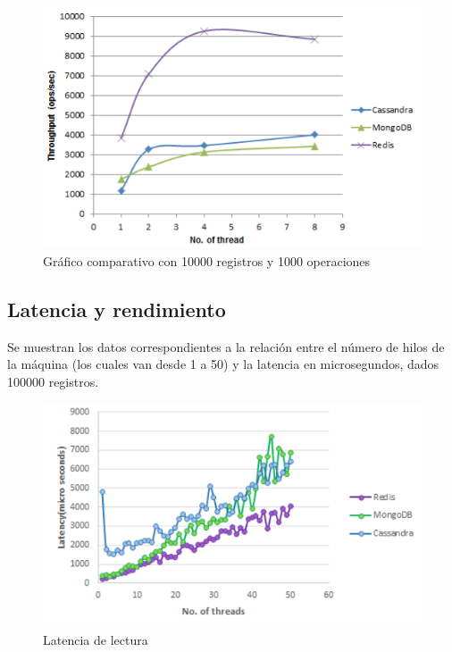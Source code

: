 \documentclass[twocolumn]{article}
\begin{document}
\begin{figure}[H]
  \includegraphics[width = \columnwidth]{img/05_g3.png}
  \caption{Gráfico comparativo con 10000 registros y 1000 operaciones}
\end{figure}

\subsection{Latencia y rendimiento}

Se muestran los datos correspondientes a la relación entre el número de hilos de la máquina (los cuales van desde 1 a 50) y la latencia en microsegundos, dados 100000 registros.

\begin{figure}[H]
  \includegraphics[width = \columnwidth]{img/06_g4.png}
  \caption{Latencia de lectura}
\end{figure}
\end{document}

